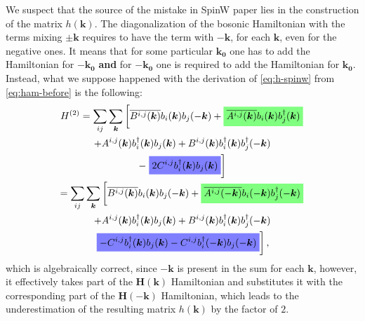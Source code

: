 \documentclass[a4paper,12pt]{article}
\newcommand{\highlightgreen}[1]{%
  \colorbox{green!50}{$\displaystyle#1$}}
\newcommand{\highlightblue}[1]{%
  \colorbox{blue!50}{$\displaystyle#1$}}
\begin{document}
            We suspect that the source of the mistake in SpinW paper \cite{toth2015linear} lies in the construction of the matrix $h(\boldsymbol{k})$. 
            The diagonalization of the bosonic Hamiltonian with the terms mixing $\pm\boldsymbol{k}$
            requires to have the term with $-\boldsymbol{k}$, for each $\boldsymbol{k}$, even for the negative ones.
            It means that for some particular $\boldsymbol{k_0}$ one has to add the Hamiltonian for $-\boldsymbol{k_0}$ \textbf{and} 
            for $-\boldsymbol{k_0}$ one is required to add the Hamiltonian for $\boldsymbol{k_0}$. Instead, what we suppose happened with the derivation of \eqref{eq:h-spinw} 
            from \eqref{eq:ham-before} is the following:
            \begin{multline}
                H^{(2)} = \sum_{ij}\sum_{\boldsymbol{k}}\left[\overline{B^{i,j}(\boldsymbol{k})}b_{i}(\boldsymbol{k})b_{j}(-\boldsymbol{k}) +
                \highlightgreen{\overline{A^{i,j}(\boldsymbol{k})}b_{i}(\boldsymbol{k})b^{\dag}_{j}(\boldsymbol{k})}\right. \\+ 
                A^{i,j}(\boldsymbol{k})b^{\dag}_{i}(\boldsymbol{k})b_{j}(\boldsymbol{k}) +
                B^{i,j}(\boldsymbol{k})b^{\dag}_{i}(\boldsymbol{k})b^{\dag}_{j}(-\boldsymbol{k}) \\-
                \left.\highlightblue{2 C^{i,j}b^{\dag}_{i}(\boldsymbol{k})b_{j}(\boldsymbol{k})}\right]\\
                = \sum_{ij}\sum_{\boldsymbol{k}}\left[\overline{B^{i,j}(\boldsymbol{k})}b_{i}(\boldsymbol{k})b_{j}(-\boldsymbol{k}) +
                \highlightgreen{\overline{A^{i,j}(-\boldsymbol{k})}b_{i}(-\boldsymbol{k})b^{\dag}_{j}(-\boldsymbol{k})}\right. \\+ 
                A^{i,j}(\boldsymbol{k})b^{\dag}_{i}(\boldsymbol{k})b_{j}(\boldsymbol{k}) +
                B^{i,j}(\boldsymbol{k})b^{\dag}_{i}(\boldsymbol{k})b^{\dag}_{j}(-\boldsymbol{k}) \\
                \left.\highlightblue{ -C^{i,j}b^{\dag}_{i}(\boldsymbol{k})b_{j}(\boldsymbol{k}) - C^{i,j}b^{\dag}_{i}(-\boldsymbol{k})b_{j}(-\boldsymbol{k})}\right],\\
            \end{multline}
            which is algebraically correct, since $-\boldsymbol{k}$ is present in the sum for each $\boldsymbol{k}$, however, 
            it effectively takes part of the $\boldsymbol{H}(\boldsymbol{k})$ Hamiltonian and substitutes it 
            with the corresponding part of the $\boldsymbol{H}(-\boldsymbol{k})$ Hamiltonian, 
            which leads to the underestimation of the resulting matrix $h(\boldsymbol{k})$ by the factor of $2$.
    

    

    

     
     
\end{document}
